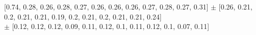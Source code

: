 
[0.74, 0.28, 0.26, 0.28, 0.27, 0.26, 0.26, 0.26, 0.27, 0.28, 0.27, 0.31] $\pm$ [0.26, 0.21, 0.2, 0.21, 0.21, 0.19, 0.2, 0.21, 0.2, 0.21, 0.21, 0.24]\\
[0.27, 0.14, 0.14, 0.1, 0.13, 0.15, 0.11, 0.13, 0.14, 0.12, 0.08, 0.13] $\pm$ [0.12, 0.12, 0.12, 0.09, 0.11, 0.12, 0.1, 0.11, 0.12, 0.1, 0.07, 0.11]\\
    